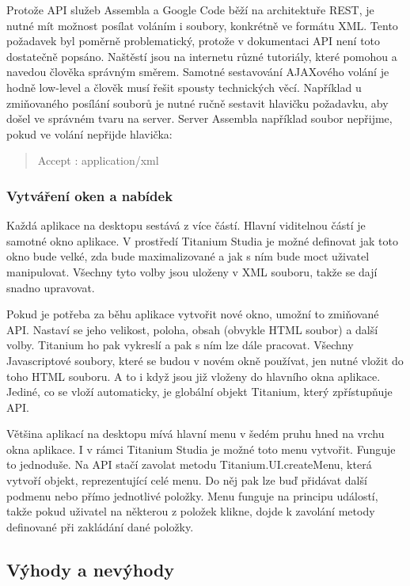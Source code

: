 Protože API služeb Assembla a Google Code běží na architektuře REST, je nutné mít možnost posílat voláním i soubory, konkrétně ve formátu XML. Tento požadavek byl poměrně problematický, protože v dokumentaci API není toto dostatečně popsáno. Naštěstí jsou na internetu různé tutoriály, které pomohou a navedou člověka správným směrem. Samotné sestavování AJAXového volání je hodně low-level a člověk musí řešit spousty technických věcí. Například u zmiňovaného posílání souborů je nutné ručně sestavit hlavičku požadavku, aby došel ve správném tvaru na server. Server Assembla například soubor nepřijme, pokud ve volání nepřijde hlavička:

\begin{quote}
Accept : application\slash xml
\end{quote}

\subsubsection{Vytváření oken a nabídek}

Každá aplikace na desktopu sestává z více částí. Hlavní viditelnou částí je samotné okno aplikace. V prostředí Titanium Studia je možné definovat jak toto okno bude velké, zda bude maximalizované a jak s ním bude moct uživatel manipulovat. Všechny tyto volby jsou uloženy v XML souboru, takže se dají snadno upravovat.

Pokud je potřeba za běhu aplikace vytvořit nové okno, umožní to zmiňované API. Nastaví se jeho velikost, poloha, obsah (obvykle HTML soubor) a další volby. Titanium ho pak vykreslí a pak s ním lze dále pracovat. Všechny Javascriptové soubory, které se budou v novém okně používat, jen nutné vložit do toho HTML souboru. A to i když jsou již vloženy do hlavního okna aplikace. Jediné, co se vloží automaticky, je globální objekt Titanium, který zpřístupňuje API.

Většina aplikací na desktopu mívá hlavní menu v šedém pruhu hned na vrchu okna aplikace. I v rámci Titanium Studia je možné toto menu vytvořit. Funguje to jednoduše. Na API stačí zavolat metodu Titanium.UI.createMenu, která vytvoří objekt, reprezentující celé menu. Do něj pak lze buď přidávat další podmenu nebo přímo jednotlivé položky. Menu funguje na principu událostí, takže pokud uživatel na některou z položek klikne, dojde k zavolání metody definované při zakládání dané položky.

\subsection{Výhody a nevýhody}

